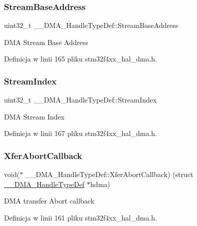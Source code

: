 \subsubsection{\texorpdfstring{Stream\+Base\+Address}{StreamBaseAddress}}
{\footnotesize\ttfamily uint32\+\_\+t \+\_\+\+\_\+\+D\+M\+A\+\_\+\+Handle\+Type\+Def\+::\+Stream\+Base\+Address}

D\+MA Stream Base Address 

Definicja w linii 165 pliku stm32f4xx\+\_\+hal\+\_\+dma.\+h.

\mbox{\label{struct_____d_m_a___handle_type_def_a3ada2bc091757d7b92ab8ca70211ccae}} 
\subsubsection{\texorpdfstring{Stream\+Index}{StreamIndex}}
{\footnotesize\ttfamily uint32\+\_\+t \+\_\+\+\_\+\+D\+M\+A\+\_\+\+Handle\+Type\+Def\+::\+Stream\+Index}

D\+MA Stream Index 

Definicja w linii 167 pliku stm32f4xx\+\_\+hal\+\_\+dma.\+h.

\mbox{\label{struct_____d_m_a___handle_type_def_a5866f59e3a12760e559c4547ebf19d37}} 
\subsubsection{\texorpdfstring{Xfer\+Abort\+Callback}{XferAbortCallback}}
{\footnotesize\ttfamily void($\ast$  \+\_\+\+\_\+\+D\+M\+A\+\_\+\+Handle\+Type\+Def\+::\+Xfer\+Abort\+Callback) (struct \hyperlink{struct_____d_m_a___handle_type_def}{\+\_\+\+\_\+\+D\+M\+A\+\_\+\+Handle\+Type\+Def} $\ast$hdma)}

D\+MA transfer Abort callback 

Definicja w linii 161 pliku stm32f4xx\+\_\+hal\+\_\+dma.\+h.

